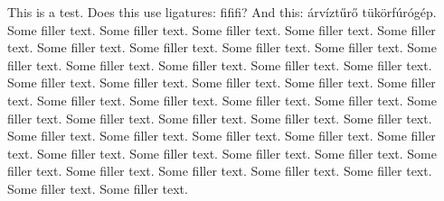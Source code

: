 \documentclass{article}
\begin{document}
This is a test.
Does this use ligatures: fififi?
And this: árvíztűrő tükörfúrógép.
Some filler text. Some filler text. Some filler text. Some filler text.
Some filler text. Some filler text. Some filler text. Some filler text.
Some filler text. Some filler text. Some filler text. Some filler text.
Some filler text. Some filler text. Some filler text. Some filler text.
Some filler text. Some filler text. Some filler text. Some filler text.
Some filler text. Some filler text. Some filler text. Some filler text.
Some filler text. Some filler text. Some filler text. Some filler text.
Some filler text. Some filler text. Some filler text. Some filler text.
Some filler text. Some filler text. Some filler text. Some filler text.
Some filler text. Some filler text. Some filler text. Some filler text.
Some filler text. Some filler text. Some filler text. Some filler text.
\end{document}
